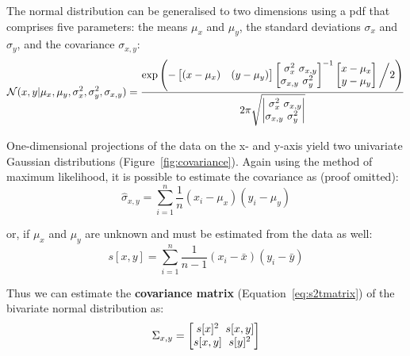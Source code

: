 \begin{refsection}
The normal distribution can be generalised to two dimensions using a
pdf that comprises five parameters: the means $\mu_x$ and $\mu_y$, the
standard deviations $\sigma_x$ and $\sigma_y$, and the covariance
$\sigma_{x,y}$:
\begin{equation}
\mathcal{N}(x,y|\mu_x,\mu_y,\sigma_x^2,\sigma_y^2,\sigma_{x,y}) = \frac{
\exp\left(-
\left[\begin{array}{@{}cc@{}}
(x-\mu_x) & (y-\mu_y)
\end{array}\right]
\left[\begin{array}{@{}c@{}c@{}}
\sigma^2_x & \sigma_{x,y}\\
\sigma_{x,y} & \sigma^2_y
\end{array}\right]^{-1}
\left[\begin{array}{@{}c@{}}
x-\mu_x\\
y-\mu_y
\end{array}\right] \biggl/ 2
\right)
}{2\pi\sqrt{
\left|\begin{array}{@{}c@{}c@{}}
\sigma^2_x & \sigma_{x,y}\\
\sigma_{x,y} & \sigma^2_y
\end{array}\right|
}}
\label{eq:2dgauss}
\end{equation}

One-dimensional projections of the data on the x- and y-axis yield two
univariate Gaussian distributions (Figure~\ref{fig:covariance}).
Again using the method of maximum likelihood, it is possible to
estimate the covariance as (proof omitted):
\begin{equation}
  \hat{\sigma}_{x,y} = \sum\limits_{i=1}^{n}\frac{1}{n}(x_i-\mu_x)(y_i-\mu_y)
\end{equation}

\noindent or, if $\mu_x$ and $\mu_y$ are unknown and must be estimated
from the data as well:
\begin{equation}
  s[x,y] = \sum\limits_{i=1}^{n}\frac{1}{n-1}(x_i-\bar{x})(y_i-\bar{y})
  \label{eq:sxy}
\end{equation}

Thus we can estimate the \textbf{covariance matrix}
(Equation~\ref{eq:s2tmatrix}) of the bivariate normal distribution as:
\begin{equation}
  \Sigma_{x,y} =
  \left[
    \begin{array}{@{}c@{~}c@{}}
      s[x]^2 & s[x,y]\\
      s[x,y] & s[y]^2
    \end{array}
    \right]
\end{equation}


\end{refsection}

